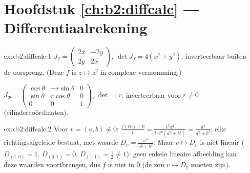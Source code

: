 \section*{Hoofdstuk \ref{ch:b2:diffcalc} --- Differentiaalrekening}

\begin{solution}{exo:b2:diffcalc:1}
$J_f = \begin{pmatrix} 2x & -2y\\ 2y & 2x\end{pmatrix}$, $\det J_f
= 4(x^2 + y^2)$: inverteerbaar buiten de oorsprong. (Deze $f$ is $z
\mapsto z^2$ in complexe vermomming.)

$J_\Phi = \begin{pmatrix} \cos\theta & -r\sin\theta & 0\\
\sin\theta & r\cos\theta & 0\\ 0 & 0 & 1\end{pmatrix}$, $\det = r$:
inverteerbaar voor $r \neq 0$ (cilindercoördinaten).
\end{solution}

\begin{solution}{exo:b2:diffcalc:2}
Voor $v = (a, b) \neq 0$: $\frac{f(tv) - 0}{t} =
\frac{t^3a^3}{t\cdot t^2(a^2+b^2)} = \frac{a^3}{a^2 + b^2}$: elke
richtingsafgeleide bestaat, met waarde $D_v = \frac{a^3}{a^2+b^2}$.
Maar $v \mapsto D_v$ is niet lineair ($D_{(1,0)} = 1$, $D_{(0,1)} =
0$, $D_{(1,1)} = \frac12 \neq 1$): geen enkele lineaire afbeelding
kan deze waarden voortbrengen, dus $f$ is niet  in
$0$ (de  zou $v \mapsto D_v$ moeten zijn).
\end{solution}

